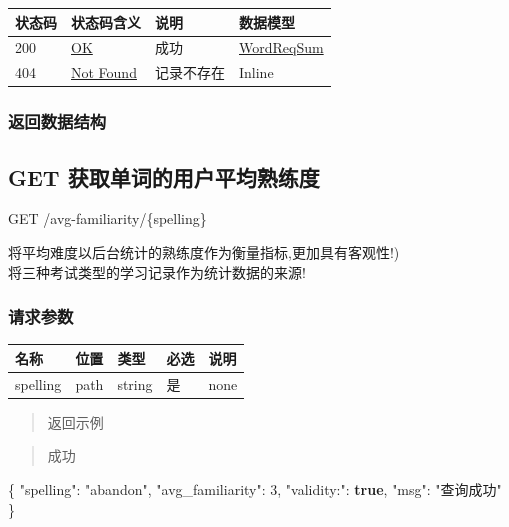 \documentclass[
]{article}
\newenvironment{Shaded}{}{}
\newcommand{\DataTypeTok}[1]{\textcolor[rgb]{0.56,0.13,0.00}{#1}}
\newcommand{\DecValTok}[1]{\textcolor[rgb]{0.25,0.63,0.44}{#1}}
\newcommand{\FunctionTok}[1]{\textcolor[rgb]{0.02,0.16,0.49}{#1}}
\newcommand{\KeywordTok}[1]{\textcolor[rgb]{0.00,0.44,0.13}{\textbf{#1}}}
\newcommand{\StringTok}[1]{\textcolor[rgb]{0.25,0.44,0.63}{#1}}
\begin{document}
\begin{longtable}[]{@{}llll@{}}
\toprule
状态码 & 状态码含义 & 说明 & 数据模型 \\
\midrule
\endhead
200 & \href{https://tools.ietf.org/html/rfc7231\#section-6.3.1}{OK} &
成功 & \protect\hyperlink{schemawordreqsum}{WordReqSum} \\
404 & \href{https://tools.ietf.org/html/rfc7231\#section-6.5.4}{Not
Found} & 记录不存在 & Inline \\
\bottomrule
\end{longtable}

\hypertarget{ux8fd4ux56deux6570ux636eux7ed3ux6784-7}{%
\subsubsection{返回数据结构}\label{ux8fd4ux56deux6570ux636eux7ed3ux6784-7}}

\hypertarget{get-ux83b7ux53d6ux5355ux8bcdux7684ux7528ux6237ux5e73ux5747ux719fux7ec3ux5ea6}{%
\subsection{GET
获取单词的用户平均熟练度}\label{get-ux83b7ux53d6ux5355ux8bcdux7684ux7528ux6237ux5e73ux5747ux719fux7ec3ux5ea6}}

GET /avg-familiarity/\{spelling\}

将平均难度以后台统计的熟练度作为衡量指标,更加具有客观性!)\\
将三种考试类型的学习记录作为统计数据的来源!

\hypertarget{ux8bf7ux6c42ux53c2ux6570-8}{%
\subsubsection{请求参数}\label{ux8bf7ux6c42ux53c2ux6570-8}}

\begin{longtable}[]{@{}lllll@{}}
\toprule
名称 & 位置 & 类型 & 必选 & 说明 \\
\midrule
\endhead
spelling & path & string & 是 & none \\
\bottomrule
\end{longtable}

\begin{quote}
返回示例
\end{quote}

\begin{quote}
成功
\end{quote}

\begin{Shaded}
\begin{Highlighting}[]
\FunctionTok{\{}
  \DataTypeTok{"spelling"}\FunctionTok{:} \StringTok{"abandon"}\FunctionTok{,}
  \DataTypeTok{"avg\_familiarity"}\FunctionTok{:} \DecValTok{3}\FunctionTok{,}
  \DataTypeTok{"validity:"}\FunctionTok{:} \KeywordTok{true}\FunctionTok{,}
  \DataTypeTok{"msg"}\FunctionTok{:} \StringTok{"查询成功"}
\FunctionTok{\}}
\end{Highlighting}
\end{Shaded}
\end{document}
